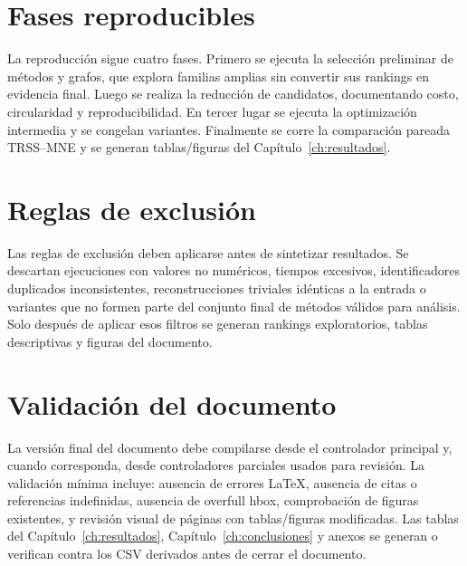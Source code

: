 \section{Fases reproducibles}

La reproducción sigue cuatro fases. Primero se ejecuta la selección preliminar de métodos y grafos, que explora familias amplias sin convertir sus rankings en evidencia final. Luego se realiza la reducción de candidatos, documentando costo, circularidad y reproducibilidad. En tercer lugar se ejecuta la optimización intermedia y se congelan variantes. Finalmente se corre la comparación pareada TRSS--MNE y se generan tablas/figuras del Capítulo~\ref{ch:resultados}.

\section{Reglas de exclusión}

Las reglas de exclusión deben aplicarse antes de sintetizar resultados. Se descartan ejecuciones con valores no numéricos, tiempos excesivos, identificadores duplicados inconsistentes, reconstrucciones triviales idénticas a la entrada o variantes que no formen parte del conjunto final de métodos válidos para análisis. Solo después de aplicar esos filtros se generan rankings exploratorios, tablas descriptivas y figuras del documento.

\section{Validación del documento}

La versión final del documento debe compilarse desde el controlador principal y, cuando corresponda, desde controladores parciales usados para revisión. La validación mínima incluye: ausencia de errores LaTeX, ausencia de citas o referencias indefinidas, ausencia de overfull hbox, comprobación de figuras existentes, y revisión visual de páginas con tablas/figuras modificadas. Las tablas del Capítulo~\ref{ch:resultados}, Capítulo~\ref{ch:conclusiones} y anexos se generan o verifican contra los CSV derivados antes de cerrar el documento.
